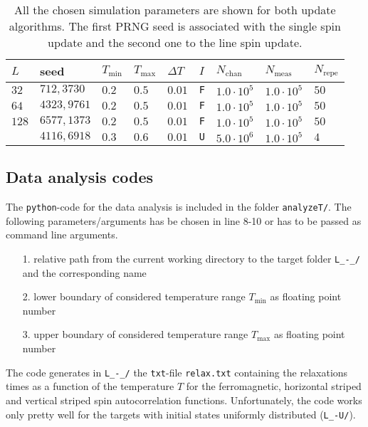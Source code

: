 \begin{table}[!h]
  \centering
  \begin{tabular}{|lllllllll|}
  \hline
  $L$ & seed & $T_\mathrm{min}$ & $T_\mathrm{max}$ & $\Delta T$ & $I$ & $N_\mathrm{chan}$ & $N_\mathrm{meas}$ & $N_\mathrm{repe}$ \\
  \hline
  $32$  & $712,3730$  & $0.2$  & $0.5$  & $0.01$ & \verb|F| & $1.0\!\cdot\!10^5$ & $1.0\!\cdot\!10^5$ & $50$ \\
  $64$  & $4323,9761$ & $0.2$  & $0.5$  & $0.01$ & \verb|F| & $1.0\!\cdot\!10^5$ & $1.0\!\cdot\!10^5$ & $50$ \\
  $128$ & $6577,1373$ & $0.2$  & $0.5$  & $0.01$ & \verb|F| & $1.0\!\cdot\!10^5$ & $1.0\!\cdot\!10^5$ & $50$ \\
        & $4116,6918$ & $0.3$  & $0.6$  & $0.01$ & \verb|U| & $5.0\!\cdot\!10^6$ & $1.0\!\cdot\!10^5$ & $4$ \\
  \hline
  \end{tabular}
  \caption{All the chosen simulation parameters are shown for both update algorithms. The first PRNG seed is associated with
           the single spin update and the second one to the line spin update.}
  \label{table:experiment_timmons}
\end{table}


\subsection*{Data analysis codes}

The \verb|python|-code for the data analysis is included in the folder \verb|analyzeT/|. The following parameters/arguments has be chosen 
in line 8-10 or has to be passed as command line arguments.
\begin{itemize}
  \item[1.] relative path from the current working directory to the target folder \verb|L_-_/| and the corresponding name
  \item[2.] lower boundary of considered temperature range $T_\mathrm{min}$ as floating point number 
  \item[3.] upper boundary of considered temperature range $T_\mathrm{max}$ as floating point number
\end{itemize}
The code generates in \verb|L_-_/| the \verb|txt|-file \verb|relax.txt| containing the relaxations times as a function of the temperature $T$
for the ferromagnetic, horizontal striped and vertical striped spin autocorrelation functions. Unfortunately, the code works only pretty well 
for the targets with initial states uniformly distributed (\verb|L_-U/|).  




